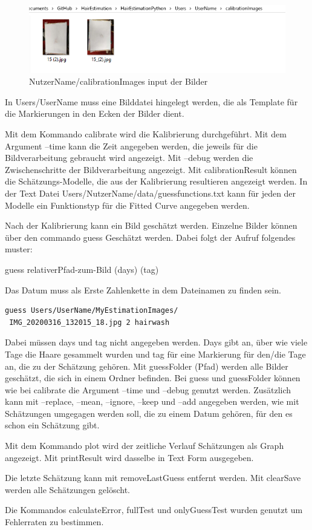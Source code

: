 \documentclass[german,a4paper, 12pt]{llncs}
\begin{document}
\begin{figure}
	\centering
	\includegraphics[width=1.0\textwidth]{figBedienung/calibrationImages.PNG}
	\caption[]{NutzerName/calibrationImages input der Bilder}
\end{figure} 

In Users/UserName muss eine Bilddatei hingelegt werden, die als Template für die Markierungen in den Ecken der Bilder dient.

Mit dem Kommando calibrate wird die Kalibrierung durchgeführt. Mit dem Argument --time kann die Zeit angegeben werden, die jeweils für die Bildverarbeitung gebraucht wird angezeigt. Mit --debug werden die Zwischenschritte der Bildverarbeitung angezeigt.
Mit calibrationResult können die Schätzungs-Modelle, die aus der Kalibrierung resultieren angezeigt werden.
In der Text Datei Users/NutzerName/data/guessfunctions.txt kann für jeden der Modelle ein Funktionstyp für die Fitted Curve angegeben werden.

Nach der Kalibrierung kann ein Bild geschätzt werden.
Einzelne Bilder können über den commando guess Geschätzt werden.
Dabei folgt der Aufruf folgendes muster:

guess relativerPfad-zum-Bild (days) (tag)
 
Das Datum muss als Erste Zahlenkette in dem Dateinamen zu finden sein.

\begin{lstlisting}[style=DOS]
 guess Users/UserName/MyEstimationImages/
 IMG_20200316_132015_18.jpg 2 hairwash
\end{lstlisting}

Dabei müssen days und tag nicht angegeben werden. Days gibt an, über wie viele Tage die Haare gesammelt wurden und tag für eine Markierung für den/die Tage an, die zu der Schätzung gehören.
Mit guessFolder (Pfad) werden alle Bilder geschätzt, die sich in einem Ordner befinden.
Bei guess und guessFolder können wie bei calibrate die Argument --time und --debug genutzt werden.
Zusätzlich kann mit --replace, --mean, --ignore, --keep und --add angegeben werden, wie mit Schätzungen umgegagen werden soll, die zu einem Datum gehören, für den es schon ein Schätzung gibt.

Mit dem Kommando plot wird der zeitliche Verlauf Schätzungen als Graph angezeigt. Mit printResult wird dasselbe in Text Form ausgegeben.

Die letzte Schätzung kann mit removeLastGuess entfernt werden. Mit clearSave werden alle Schätzungen gelöscht.

Die Kommandos calculateError, fullTest und onlyGuessTest wurden genutzt um Fehlerraten zu bestimmen. 
\end{document}
